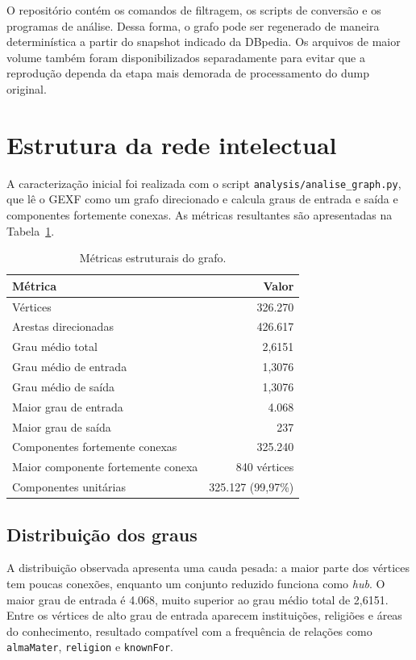 \documentclass[10pt,a4paper]{article}
\begin{document}
O repositório contém os comandos de filtragem, os scripts de conversão e os programas de análise. Dessa forma, o grafo pode ser regenerado de maneira determinística a partir do snapshot indicado da DBpedia. Os arquivos de maior volume também foram disponibilizados separadamente para evitar que a reprodução dependa da etapa mais demorada de processamento do dump original.

\section{Estrutura da rede intelectual}

A caracterização inicial foi realizada com o script \texttt{analysis/analise\_graph.py}, que lê o GEXF como um grafo direcionado e calcula graus de entrada e saída e componentes fortemente conexas. As métricas resultantes são apresentadas na Tabela~\ref{tab:metricas}.

\begin{table}[htbp]
  \centering
  \caption{Métricas estruturais do grafo.}
  \label{tab:metricas}
  \begin{tabular}{lr}
    \toprule
    Métrica & Valor \\
    \midrule
    Vértices & 326.270 \\
    Arestas direcionadas & 426.617 \\
    Grau médio total & 2,6151 \\
    Grau médio de entrada & 1,3076 \\
    Grau médio de saída & 1,3076 \\
    Maior grau de entrada & 4.068 \\
    Maior grau de saída & 237 \\
    Componentes fortemente conexas & 325.240 \\
    Maior componente fortemente conexa & 840 vértices \\
    Componentes unitárias & 325.127 (99,97\%) \\
    \bottomrule
  \end{tabular}
\end{table}

\subsection{Distribuição dos graus}

A distribuição observada apresenta uma cauda pesada: a maior parte dos vértices tem poucas conexões, enquanto um conjunto reduzido funciona como \textit{hub}. O maior grau de entrada é 4.068, muito superior ao grau médio total de 2,6151. Entre os vértices de alto grau de entrada aparecem instituições, religiões e áreas do conhecimento, resultado compatível com a frequência de relações como \texttt{almaMater}, \texttt{religion} e \texttt{knownFor}.
\end{document}

